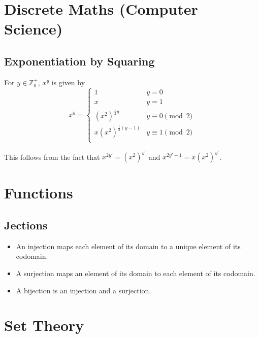 \documentclass[fleqn,a4paper,11pt]{article}
\newcommand{\setstyle}{\mathbb}
\newcommand{\Integers}{\setstyle Z}
\begin{document}
    \section{Discrete Maths (Computer Science)}

    \subsection{Exponentiation by Squaring} \label{sec_exp_by_squaring}


    For \(y \in \Integers_0^+\), \(x^y\) is given by
    \begin{equation}
    x^y =
        \begin{cases}
        1 & y = 0 \\
        x & y = 1 \\
        (x ^ 2)^{\frac 12 y} & y \equiv 0 \pmod 2\\
        x(x ^ 2)^{\frac 12 (y-1)} & y \equiv 1 \pmod 2\\
        \end{cases}
    \end{equation}

    This follows from the fact that
    \(x^{2y'} = (x^2)^{y'}\) and \(x^{2y' + 1} = x(x^2)^{y'}\).

    \section{Functions}


    \subsection{Jections}


    \begin{itemize}
    \item An injection maps each element of its domain to a unique element of
          its codomain.
    \item A surjection maps an element of its domain to each element of its
          codomain.
    \item A bijection is an injection and a surjection.
    \end{itemize}

    \section{Set Theory}
\end{document}
